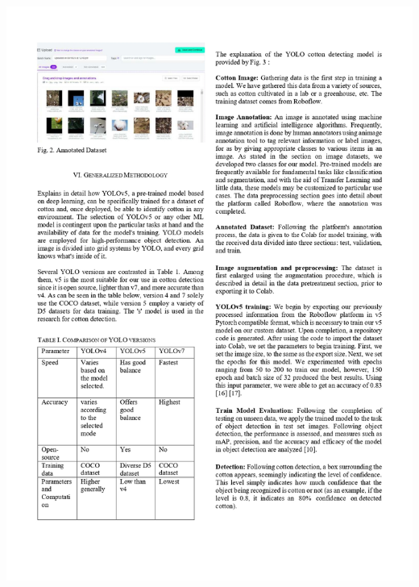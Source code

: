\documentclass[12pt,a4paper]{report}
\begin{document}
\includegraphics[scale=0.7]{images/copyright/publication/Publication/Publication_page-0004.jpg}
\newpage
\end{document}
